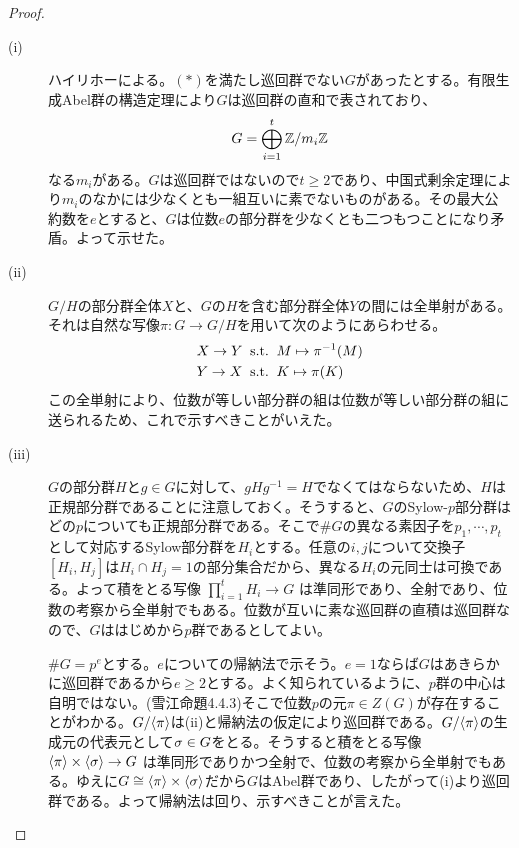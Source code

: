 \begin{proof} ${}$
  \begin{description}
    \item[(i)] ハイリホーによる。$(*)$を満たし巡回群でない$G$があったとする。有限生成Abel群の構造定理により$G$は巡回群の直和で表されており、
    \[
    G = \bigoplus_{i=1}^t {\mathbb Z} / m_i {\mathbb Z}
    \]
    なる$m_i$がある。$G$は巡回群ではないので$t \geq 2$であり、中国式剰余定理により$m_i$のなかには少なくとも一組互いに素でないものがある。その最大公約数を$e$とすると、$G$は位数$e$の部分群を少なくとも二つもつことになり矛盾。よって示せた。
    \item[(ii)] $G/H$の部分群全体$X$と、$G$の$H$を含む部分群全体$Y$の間には全単射がある。それは自然な写像$\pi \colon G \to G/H$を用いて次のようにあらわせる。
    \begin{align*}
      &X \to Y \; \; \text{s.t.} \; \; M \mapsto \pi^{-1}(M) \\
      &Y \to X \; \; \text{s.t.} \; \; K \mapsto \pi(K)
    \end{align*}
    この全単射により、位数が等しい部分群の組は位数が等しい部分群の組に送られるため、これで示すべきことがいえた。
    \item[(iii)] $G$の部分群$H$と$g \in G$に対して、$gHg^{-1} = H$でなくてはならないため、$H$は正規部分群であることに注意しておく。そうすると、$G$のSylow-$p$部分群はどの$p$についても正規部分群である。そこで$\# G$の異なる素因子を$p_1, \cdots ,p_t$として対応するSylow部分群を$H_i$とする。任意の$i,j$について交換子$[H_i,H_j]$は$H_i \cap H_j = 1$の部分集合だから、異なる$H_i$の元同士は可換である。よって積をとる写像
    $
    \prod_{i=1}^t H_i \to G
    $
    は準同形であり、全射であり、位数の考察から全単射でもある。位数が互いに素な巡回群の直積は巡回群なので、$G$ははじめから$p$群であるとしてよい。

    $\# G = p^e$とする。$e$についての帰納法で示そう。$e=1$ならば$G$はあきらかに巡回群であるから$e \geq 2$とする。よく知られているように、$p$群の中心は自明ではない。(雪江\cite{雪代1}命題4.4.3)そこで位数$p$の元$\pi \in Z(G)$が存在することがわかる。$G/\langle \pi \rangle$は(ii)と帰納法の仮定により巡回群である。$G/\langle \pi \rangle$の生成元の代表元として${\sigma} \in G$をとる。そうすると積をとる写像
    $
    \langle \pi \rangle \times \langle {\sigma} \rangle \to G
    $
    は準同形でありかつ全射で、位数の考察から全単射でもある。ゆえに$G \cong \langle \pi \rangle \times \langle {\sigma} \rangle$だから$G$はAbel群であり、したがって(i)より巡回群である。よって帰納法は回り、示すべきことが言えた。
    \end{description}
\end{proof}

